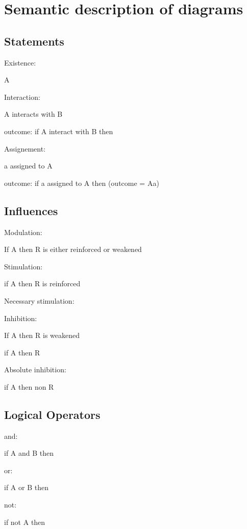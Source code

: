 \section{Semantic description of \ER{} diagrams}

\subsection{Statements}

Existence:

A

Interaction:

A interacts with B

outcome: if A interact with B then  

Assignement:

a assigned to A

outcome: if a assigned to A then (outcome = A{a})

\subsection{Influences}

Modulation:

If A then R is either reinforced or weakened

Stimulation:

if A then R is reinforced

Necessary stimulation: 

Inhibition:

If A then R is weakened

if A then R 

Absolute inhibition:

if A then non R

\subsection{Logical Operators}

and:

if A and B then

or:

if A or B then

not:

if not A then 